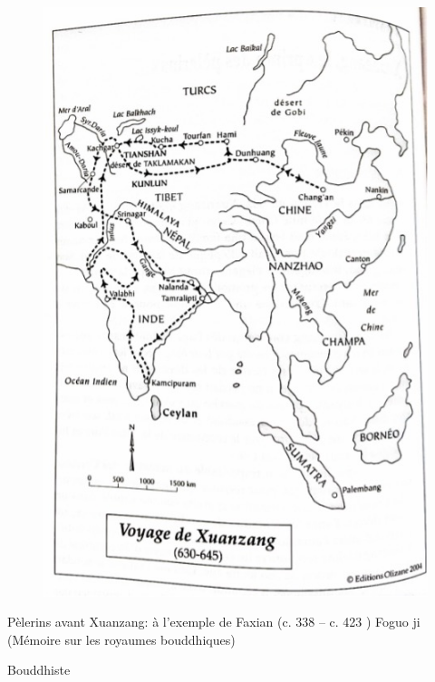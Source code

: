 \begin{figure}[!h]
    \centering
        \includegraphics[width=.5\textwidth]{ConfucianismeTaoismeBouddhismeChinois/Images/XuanzangVoyage2.jpg}

    \label{fig:enter-label}
\end{figure}
Pèlerins avant Xuanzang: à l’exemple de Faxian    (c. 338 -- c. 423 )	Foguo ji (Mémoire sur les royaumes bouddhiques)

\begin{Def}[Fo]
    Bouddhiste
\end{Def}
